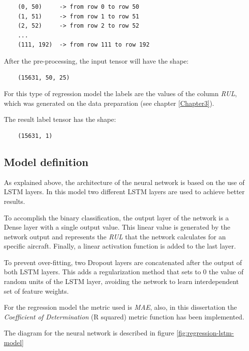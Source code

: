 \begin{verbatim}
    (0, 50)     -> from row 0 to row 50
    (1, 51)     -> from row 1 to row 51
    (2, 52)     -> from row 2 to row 52
    ...
    (111, 192)  -> from row 111 to row 192
\end{verbatim}

After the pre-processing, the input tensor will have the shape:

\begin{verbatim}
    (15631, 50, 25)
\end{verbatim}

For this type of regression model the labels are the values of the column \textit{RUL}, which was generated on the data preparation (see chapter \ref{Chapter3}).

The result label tensor has the shape:

\begin{verbatim}
    (15631, 1)
\end{verbatim}


\subsection{Model definition}

As explained above, the architecture of the neural network is based on the use of LSTM layers.
In this model two different LSTM layers are used to achieve better results.

To accomplish the binary classification, the output layer of the network is a Dense layer with a single output value.
This linear value is generated by the network output and represents the \textit{RUL} that the network calculates for an specific aircraft.
Finally, a linear activation function is added to the last layer.

To prevent over-fitting, two Dropout layers are concatenated after the output of both LSTM layers.
This adds a regularization method that sets to 0 the value of random units of the LSTM layer, avoiding the network to learn interdependent set of feature weights.

For the regression model the metric used is \textit{MAE}, also, in this dissertation the \textit{Coefficient of Determination} (R squared) metric function has been implemented.

The diagram for the neural network is described in figure \ref{fig:regression-lstm-model}

